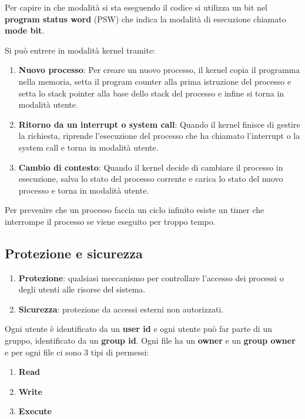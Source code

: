 \documentclass[a4paper]{article}
\theoremstyle{break}
\theoremstyle{break}
\theoremstyle{break}
\theoremstyle{break}
\begin{document}
\noindent
Per capire in che modalità si sta eseguendo il codice si utilizza un bit nel
\textbf{program status word} (PSW) che indica la modalità di esecuzione chiamato
\textbf{mode bit}.

\noindent Si può entrere in modalità kernel tramite:
\begin{enumerate}
  \item \textbf{Nuovo processo}: Per creare un nuovo processo, il kernel copia il
    programma nella memoria, setta il program counter alla prima istruzione del
    processo e setta lo stack pointer alla base dello stack del processo e infine
    si torna in modalità utente. 

    \item \textbf{Ritorno da un interrupt o system call}: Quando il kernel finisce
      di gestire la richiesta, riprende l'esecuzione del processo che ha chiamato
      l'interrupt o la system call e torna in modalità utente.
      
    \item \textbf{Cambio di contesto}: Quando il kernel decide di cambiare il
      processo in esecuzione, salva lo stato del processo corrente e carica lo
      stato del nuovo processo e torna in modalità utente.
\end{enumerate}

\noindent
Per prevenire che un processo faccia un ciclo infinito esiste un timer che interrompe
il processo se viene eseguito per troppo tempo.

\subsection{Protezione e sicurezza}
\begin{enumerate}
  \item \textbf{Protezione}: qualsiasi meccanismo per controllare l'accesso dei
    processi o degli utenti alle risorse del sistema.

  \item \textbf{Sicurezza}: protezione da accessi esterni non autorizzati.
\end{enumerate}

\noindent
Ogni utente è identificato da un \textbf{user id} e ogni utente può far parte di
un gruppo, identificato da un \textbf{group id}. Ogni file ha un \textbf{owner} e
un \textbf{group owner} e per ogni file ci sono 3 tipi di permessi:
\begin{enumerate}
  \item \textbf{Read}
  \item \textbf{Write}
  \item \textbf{Execute}
\end{enumerate}
\end{document}
